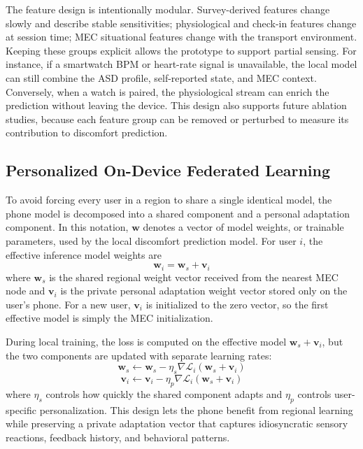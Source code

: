 \documentclass[lettersize,journal]{IEEEtran}
\begin{document}
The feature design is intentionally modular. Survey-derived features
change slowly and describe stable sensitivities; physiological and
check-in features change at session time; MEC situational features
change with the transport environment. Keeping these groups explicit
allows the prototype to support partial sensing. For instance, if a
smartwatch BPM or heart-rate signal is unavailable, the local model can
still combine the ASD profile, self-reported state, and MEC context.
Conversely, when a watch is paired, the physiological stream can enrich
the prediction without leaving the device. This design also supports
future ablation studies, because each feature group can be removed or
perturbed to measure its contribution to discomfort prediction.

\subsection{Personalized On-Device Federated Learning}

To avoid forcing every user in a region to share a single identical
model, the phone model is decomposed into a shared component and a
personal adaptation component. In this notation, $\mathbf{w}$ denotes a
vector of model weights, or trainable parameters, used by the local
discomfort prediction model. For user $i$, the effective inference model
weights are
\begin{equation}
    \mathbf{w}_i = \mathbf{w}_s + \mathbf{v}_i
\end{equation}
where $\mathbf{w}_s$ is the shared regional weight vector received from
the nearest MEC node and $\mathbf{v}_i$ is the private personal
adaptation weight vector stored only on the user's phone. For a new
user, $\mathbf{v}_i$ is initialized to the zero vector, so the first
effective model is simply the MEC initialization.

During local training, the loss is computed on the effective model
$\mathbf{w}_s+\mathbf{v}_i$, but the two components are updated with
separate learning rates:
\begin{equation}
    \mathbf{w}_s \leftarrow \mathbf{w}_s
    - \eta_s \nabla \mathcal{L}_i(\mathbf{w}_s + \mathbf{v}_i)
\end{equation}
\begin{equation}
    \mathbf{v}_i \leftarrow \mathbf{v}_i
    - \eta_p \nabla \mathcal{L}_i(\mathbf{w}_s + \mathbf{v}_i)
\end{equation}
where $\eta_s$ controls how quickly the shared component adapts and
$\eta_p$ controls user-specific personalization. This design lets the
phone benefit from regional learning while preserving a private
adaptation vector that captures idiosyncratic sensory reactions,
feedback history, and behavioral patterns.
\end{document}

